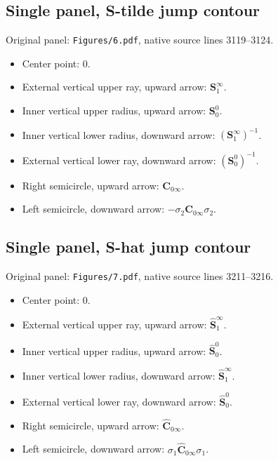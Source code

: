 \subsection*{Single panel, S-tilde jump contour}
\noindent Original panel: \texttt{Figures/6.pdf}, native source lines 3119--3124.
\begin{itemize}\itemsep=0pt
\item Center point: $0$.
\item External vertical upper ray, upward arrow: $\mathbf{S}_1^\infty{}$.
\item Inner vertical upper radius, upward arrow: $\mathbf{S}_0^0{}$.
\item Inner vertical lower radius, downward arrow: $(\mathbf{S}_1^\infty{})^{-1}$.
\item External vertical lower ray, downward arrow: $(\mathbf{S}_0^0{})^{-1}$.
\item Right semicircle, upward arrow: $\mathbf{C}_{0\infty}{}$.
\item Left semicircle, downward arrow: $-\sigma_2\mathbf{C}_{0\infty}{}\sigma_2$.
\end{itemize}

\subsection*{Single panel, S-hat jump contour}
\noindent Original panel: \texttt{Figures/7.pdf}, native source lines 3211--3216.
\begin{itemize}\itemsep=0pt
\item Center point: $0$.
\item External vertical upper ray, upward arrow: $\widehat{\mathbf{S}}_1^\infty$.
\item Inner vertical upper radius, upward arrow: $\widehat{\mathbf{S}}_0^0$.
\item Inner vertical lower radius, downward arrow: $\widehat{\mathbf{S}}_1^\infty$.
\item External vertical lower ray, downward arrow: $\widehat{\mathbf{S}}_0^0$.
\item Right semicircle, upward arrow: $\widehat{\mathbf{C}}_{0\infty}$.
\item Left semicircle, downward arrow: $\sigma_1\widehat{\mathbf{C}}_{0\infty}\sigma_1$.
\end{itemize}
